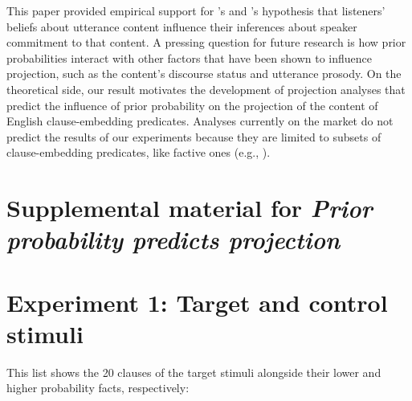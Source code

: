 \documentclass[11pt,fleqn]{article}
\newcommand{\6}{\mbox{$[\hspace*{-.6mm}[$}}
\newcommand{\9}{\mbox{$]\hspace*{-.6mm}]$}}
\newcommand{\citetpos}[1]{\citeauthor{#1}'s \citeyear{#1}}
\begin{document}
This paper provided empirical support for \citetpos{stevens-etal2017} and \citetpos{tbd-variability} hypothesis that listeners' beliefs about utterance content influence their inferences about speaker commitment to that content. A pressing question for future research is how prior probabilities interact with other factors that have been shown to influence projection, such as the content's discourse status and utterance prosody. On the theoretical side, our result motivates the development of projection analyses that predict the influence of prior probability on the projection of the content of English clause-embedding predicates. Analyses currently on the market do not predict the results of our experiments  because they are limited to subsets of clause-embedding predicates, like factive ones (e.g., ).



%

%
%


\newpage

\appendix

\setcounter{table}{0}
\renewcommand{\thetable}{A\arabic{table}}

\setcounter{figure}{0}
\renewcommand{\thefigure}{A\arabic{figure}}

\section*{Supplemental material for {\em Prior probability predicts projection}}

\section{Experiment 1: Target and control stimuli}\label{a-stim}

This list shows the 20 clauses of the target stimuli alongside their lower and higher probability facts, respectively:
\end{document}
